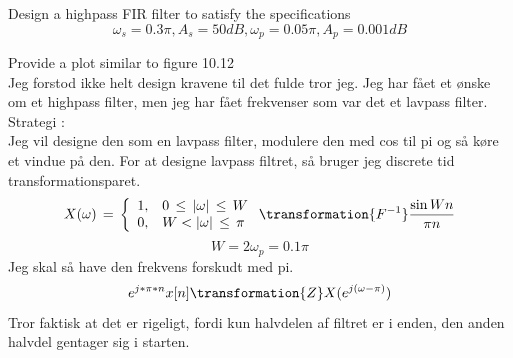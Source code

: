 \begin{Opgaver}
\begin{kapitel}
\begin{Opgave}[Opgave 10.10]
\begin{UnderOpgave}
            \end{UnderOpgave}
        \end{Opgave}       
        \begin{Opgave}     
            Design a highpass FIR filter to satisfy the specifications 
            \[\omega_s = 0.3\pi, A_s = 50dB, \omega_p = 0.05\pi, A_p = 0.001dB\]
            \begin{UnderOpgave}
                Provide a plot similar to figure 10.12\\
                Jeg forstod ikke helt design kravene til det fulde tror jeg. Jeg har fået et ønske om et highpass filter, 
                men jeg har fået frekvenser som var det et lavpass filter.\\
                \color{teal}Strategi : \\
                Jeg vil designe den som en lavpass filter, modulere den med cos til pi og så køre et vindue på den. 
                \color{black}
                For at designe lavpass filtret, så bruger jeg discrete tid transformationsparet. 
                \[X(\omega)\,=\,\left\{\begin{array}{l l}{{1,}}&{{0\,\le\,|\omega|\,\le\,W}}\\ {{0,}}&{{W<|\omega|\,\le\,\pi}}\end{array}\right. \transformation{F^{-1}} \frac{\sin Wn}{\pi n}\]
                \[W = 2 \omega_p = 0.1\pi\]
                Jeg skal så have den frekvens forskudt med pi. 
                \[e^{j*\pi * n}x[n] \transformation{Z} X(e^{j(\omega - \pi)})\]
                Tror faktisk at det er rigeligt, fordi kun halvdelen af filtret er i enden, den anden halvdel gentager sig i starten. 
                

\end{UnderOpgave}
\end{Opgave}
\end{kapitel}
\end{Opgaver}
